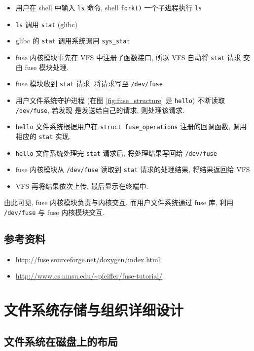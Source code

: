 \documentclass[nofonts, titlepage]{ctexart}
\begin{document}
\begin{itemize}
\item
  用户在 shell 中输入 \texttt{ls} 命令, shell \texttt{fork()}
  一个子进程执行 \texttt{ls}
\item
  \texttt{ls} 调用 \texttt{stat} (glibc)
\item
  glibc 的 \texttt{stat} 调用系统调用 \texttt{sys\_stat}
\item
  fuse 内核模块事先在 VFS 中注册了函数接口, 所以 VFS 自动将
  \texttt{stat} 请求 交由 fuse 模块处理.
\item
  fuse 模块收到 \texttt{stat} 请求, 将请求写至 \texttt{/dev/fuse}
\item
    用户文件系统守护进程 (在图 \ref{fig:fuse_structure}
    是 \texttt{hello}) 不断读取
  \texttt{/dev/fuse}, 若发现 是发送给自己的请求, 则处理该请求.
\item
  \texttt{hello} 文件系统根据用户在 \texttt{struct fuse\_operations}
  注册的回调函数, 调用 相应的 \texttt{stat} 实现.
\item
  \texttt{hello} 文件系统处理完 \texttt{stat} 请求后, 将处理结果写回给
  \texttt{/dev/fuse}
\item
  fuse 内核模块从 \texttt{/dev/fuse} 读取到 \texttt{stat}
  请求的处理结果, 将结果返回给 VFS
\item
  VFS 再将结果依次上传, 最后显示在终端中.
\end{itemize}

由此可见, fuse 内核模块负责与内核交互, 而用户文件系统通过 fuse 库, 利用
\texttt{/dev/fuse} 与 fuse 内核模块交互.

\subsection{参考资料}\label{ux53c2ux8003ux8d44ux6599}

\begin{itemize}
\item
    \url{http://fuse.sourceforge.net/doxygen/index.html}
\item
    \url{http://www.cs.nmsu.edu/~pfeiffer/fuse-tutorial/}
\end{itemize}

\section{文件系统存储与组织详细设计}\label{ux6587ux4ef6ux7cfbux7edfux5b58ux50a8ux4e0eux7ec4ux7ec7ux8be6ux7ec6ux8bbeux8ba1}

\subsection{文件系统在磁盘上的布局}\label{ux6587ux4ef6ux7cfbux7edfux5728ux78c1ux76d8ux4e0aux7684ux5e03ux5c40}
\end{document}
